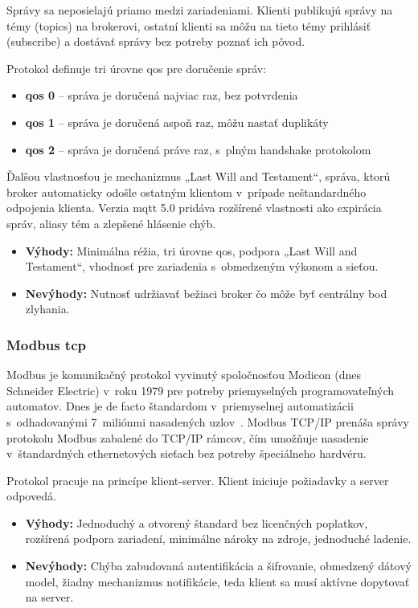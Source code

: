 Správy sa neposielajú priamo medzi zariadeniami. Klienti publikujú správy na
témy (topics) na brokerovi, ostatní klienti sa môžu na tieto témy prihlásiť
(subscribe) a dostávať správy bez potreby poznať ich pôvod.

Protokol definuje tri úrovne \acrshort{qos} pre doručenie správ:
\begin{itemize}
      \item \textbf{\acrshort{qos} 0} -- správa je doručená najviac raz, bez potvrdenia
      \item \textbf{\acrshort{qos} 1} -- správa je doručená aspoň raz, môžu nastať duplikáty
      \item \textbf{\acrshort{qos} 2} -- správa je doručená práve raz, s~plným handshake protokolom
\end{itemize}

Ďalšou vlastnosťou je mechanizmus „Last Will and Testament“, správa,
ktorú broker automaticky odošle ostatným klientom v~prípade neštandardného
odpojenia klienta. Verzia \acrshort{mqtt} 5.0 pridáva rozšírené vlastnosti
ako expirácia správ, aliasy tém a zlepšené hlásenie chýb.

\begin{itemize}
      \item \textbf{Výhody:} Minimálna réžia,
            tri úrovne \acrshort{qos}, podpora „Last Will and Testament“, vhodnosť pre zariadenia
            s~obmedzeným výkonom a sieťou.
      \item \textbf{Nevýhody:} Nutnosť udržiavať bežiaci broker čo môže byť centrálny
            bod zlyhania.
\end{itemize}

\subsubsection{Modbus \acrshort{tcp}}

Modbus je komunikačný protokol vyvinutý spoločnosťou Modicon (dnes Schneider
Electric) v~roku 1979 pre potreby priemyselných programovateľných automatov.
Dnes je de facto štandardom v~priemyselnej automatizácii s~odhadovanými
7~miliónmi nasadených uzlov~\cite{t14}. Modbus TCP/IP prenáša správy protokolu
Modbus zabalené do TCP/IP rámcov, čím umožňuje nasadenie v~štandardných
ethernetových sieťach bez potreby špeciálneho hardvéru.

Protokol pracuje na princípe klient-server. Klient iniciuje požiadavky a server
odpovedá.

\begin{itemize}
      \item \textbf{Výhody:} Jednoduchý a otvorený štandard bez licenčných poplatkov,
            rozšírená podpora zariadení, minimálne nároky na zdroje, jednoduché ladenie.
      \item \textbf{Nevýhody:} Chýba zabudovaná autentifikácia a šifrovanie,
            obmedzený dátový model, žiadny mechanizmus notifikácie, teda
            klient sa musí aktívne dopytovať na server.
\end{itemize}

